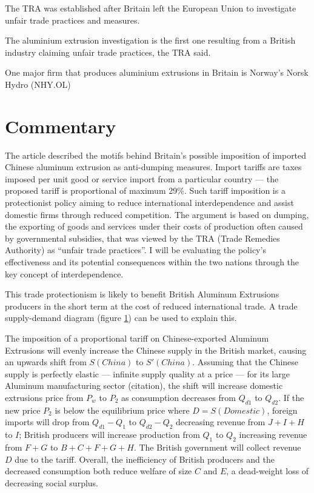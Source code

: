 \documentclass[a4paper,12pt]{article}
\newcommand{\tikzfig}[1]{}
\begin{document}
The TRA was established after Britain left the European Union to investigate unfair trade practices and measures.

The aluminium extrusion investigation is the first one resulting from a British industry claiming unfair trade practices, the TRA said.

One major firm that produces aluminium extrusions in Britain is Norway's Norsk Hydro (NHY.OL)

\newpage
\section*{Commentary}


The article described the motifs behind Britain's possible imposition of imported Chinese aluminum extrusion as anti-dumping measures. Import tariffs are taxes imposed per unit good or service import from a particular country --- the proposed tariff is proportional of maximum 29\%. Such tariff imposition is a protectionist policy aiming to reduce international interdependence and assist domestic firms through reduced competition. The argument is based on dumping, the exporting of goods and services under their costs of production often caused by governmental subsidies, that was viewed by the TRA (Trade Remedies Authority) as ``unfair trade practices''. I will be evaluating the policy's effectiveness and its potential consequences within the two nations through the key concept of interdependence.

This trade protectionism is likely to benefit British Aluminum Extrusions producers in the short term at the cost of reduced international trade. A trade supply-demand diagram (figure \ref{fig:tariff}) can be used to explain this.

\begin{figure}[H]
	\centering
	 \tikzfig{assets/tariffs.txt}
	\caption{}
	\label{fig:tariff}
\end{figure}

The imposition of a proportional tariff on Chinese-exported Aluminum Extrusions will evenly increase the Chinese supply in the British market, causing an upwards shift from $S(China)$ to $S'(China)$. Assuming that the Chinese supply is perfectly elastic --- infinite supply quality at a price --- for its large Aluminum manufacturing sector (citation), the shift will increase domestic extrusions price from $P_w$ to $P_2$ as consumption decreases from $Q_{d1}$ to $Q_{d2}$. If the new price $P_2$ is below the equilibrium price where $D=S(Domestic)$, foreign imports will drop from $Q_{d1}-Q_{1}$ to $Q_{d2}-Q_{2}$ decreasing revenue from $J+I+H$ to $I$; British producers will increase production from $Q_1$ to $Q_2$ increasing revenue from $F+G$ to $B+C+F+G+H$. The British government will collect revenue $D$ due to the tariff. Overall, the inefficiency of British producers and the decreased consumption both reduce welfare of size $C$ and $E$, a dead-weight loss of decreasing social surplus.
\end{document}
